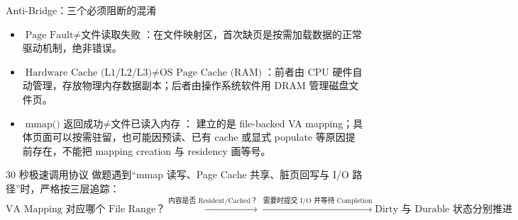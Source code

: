 \documentclass[UTF8,fontset=none,11pt,a4paper]{ctexart}
\begin{document}
\begin{warnbox}{Anti-Bridge：三个必须阻断的混淆}
\begin{itemize}
  \item \(\text{Page Fault} \neq \text{文件读取失败}\)：在文件映射区，首次缺页是按需加载数据的正常驱动机制，绝非错误。
  \item \(\text{Hardware Cache (L1/L2/L3)} \neq \text{OS Page Cache (RAM)}\)：前者由 CPU 硬件自动管理，存放物理内存数据副本；后者由操作系统软件用 DRAM 管理磁盘文件页。
  \item \(\text{mmap()} \text{ 返回成功} \neq \text{文件已读入内存}\)： 建立的是 file-backed VA mapping；具体页面可以按需驻留，也可能因预读、已有 cache 或显式 populate 等原因提前存在，不能把 mapping creation 与 residency 画等号。
\end{itemize}
\end{warnbox}

\begin{corebox}{30 秒极速调用协议}
做题遇到“mmap 读写、Page Cache 共享、脏页回写与 I/O 路径”时，严格按三层追踪：
\[
\boxed{\text{VA Mapping 对应哪个 File Range？}} \xrightarrow{\text{内容是否 Resident/Cached？}} \xrightarrow{\text{需要时提交 I/O 并等待 Completion}} \boxed{\text{Dirty 与 Durable 状态分别推进}}
\]
\end{corebox}
\end{document}
